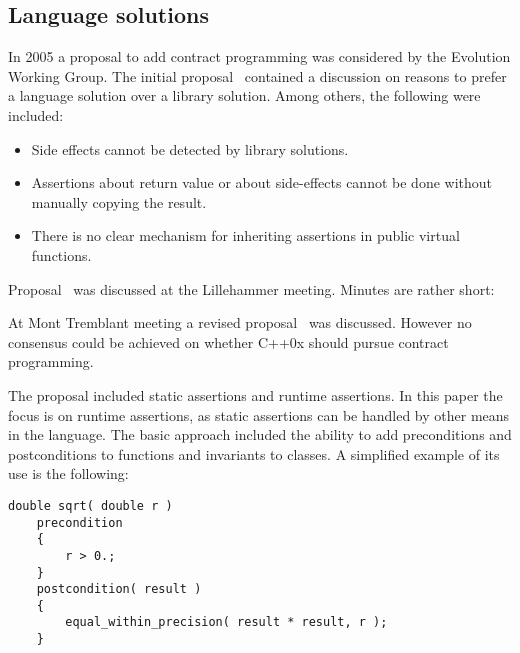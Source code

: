 \subsection{Language solutions}

In 2005 a proposal to add contract programming was considered by the Evolution
Working Group. The initial proposal~\cite{n1613} contained a discussion on reasons to prefer
a language solution over a library solution. Among others, the following were
included:

\begin{itemize}

\item Side effects cannot be detected by library solutions.

\item Assertions about return value or about side-effects cannot be done without manually copying the
result.

\item There is no clear mechanism for inheriting assertions in public virtual
functions.

\end{itemize}

Proposal~\cite{n1773} was discussed at the Lillehammer meeting.
Minutes are rather short:

\vspace{12pt}
\noindent
{}
\vspace{12pt}

At Mont Tremblant meeting a revised proposal~\cite{n1866} was discussed. However
no consensus could be achieved on whether C++0x should pursue contract
programming.

The proposal included static assertions and runtime assertions. In this paper
the focus is on runtime assertions, as static assertions can be handled by other
means in the language. The basic approach included the ability to add
preconditions and postconditions to functions and invariants to classes. A
simplified example of its use is the following:

\begin{lstlisting}[style=cppcontract05]
double sqrt( double r )
    precondition
    {
        r > 0.;
    }
    postcondition( result )
    {
        equal_within_precision( result * result, r );
    }
\end{lstlisting}

